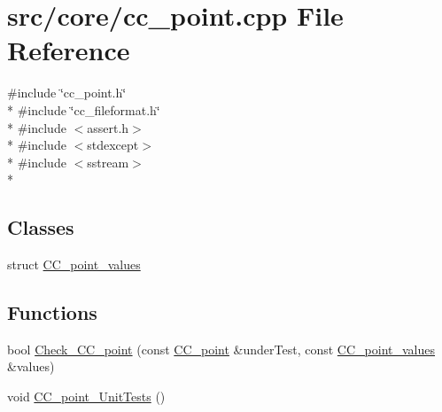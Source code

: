 \hypertarget{a00207}{\section{src/core/cc\-\_\-point.cpp File Reference}
\label{a00207}
}
{\ttfamily \#include \char`\"{}cc\-\_\-point.\-h\char`\"{}}\\*
{\ttfamily \#include \char`\"{}cc\-\_\-fileformat.\-h\char`\"{}}\\*
{\ttfamily \#include $<$assert.\-h$>$}\\*
{\ttfamily \#include $<$stdexcept$>$}\\*
{\ttfamily \#include $<$sstream$>$}\\*
\subsection*{Classes}
\begin{DoxyCompactItemize}
\item 
struct \hyperlink{a00035}{C\-C\-\_\-point\-\_\-values}
\end{DoxyCompactItemize}
\subsection*{Functions}
\begin{DoxyCompactItemize}
\item 
bool \hyperlink{a00207_a1235aa78f60b667bcc789a0cb09961da}{Check\-\_\-\-C\-C\-\_\-point} (const \hyperlink{a00034}{C\-C\-\_\-point} \&under\-Test, const \hyperlink{a00035}{C\-C\-\_\-point\-\_\-values} \&values)
\item 
void \hyperlink{a00207_a96313599b1daa9badacfb3eae6aa74de}{C\-C\-\_\-point\-\_\-\-Unit\-Tests} ()
\end{DoxyCompactItemize}


